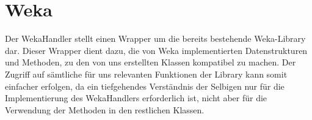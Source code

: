 \section{Weka}



Der WekaHandler stellt einen Wrapper um die bereits bestehende Weka-Library dar. Dieser Wrapper dient dazu, die von Weka implementierten Datenstrukturen und Methoden, zu den von uns erstellten Klassen kompatibel zu machen. Der Zugriff auf sämtliche für uns relevanten Funktionen der Library kann somit einfacher erfolgen, da ein tiefgehendes Verständnis der Selbigen nur für die Implementierung des WekaHandlers erforderlich ist, nicht aber für die Verwendung der Methoden in den restlichen Klassen.

